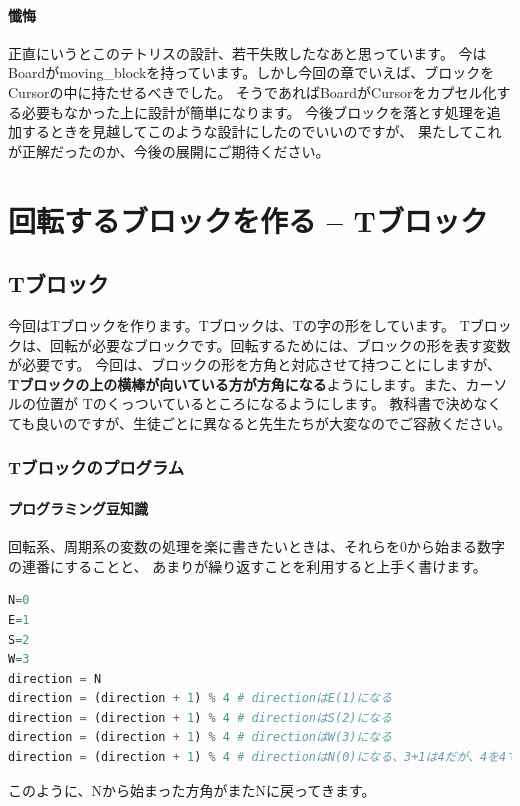 \documentclass[12pt, a4paper, dvipdfmx]{book}
\begin{document}
\subsubsection{懺悔}
正直にいうとこのテトリスの設計、若干失敗したなあと思っています。
今はBoardがmoving\_blockを持っています。しかし今回の章でいえば、ブロックをCursorの中に持たせるべきでした。
そうであればBoardがCursorをカプセル化する必要もなかった上に設計が簡単になります。
今後ブロックを落とす処理を追加するときを見越してこのような設計にしたのでいいのですが、
果たしてこれが正解だったのか、今後の展開にご期待ください。

\chapter{回転するブロックを作る -- Tブロック}
\section{Tブロック}
今回はTブロックを作ります。Tブロックは、Tの字の形をしています。
Tブロックは、回転が必要なブロックです。回転するためには、ブロックの形を表す変数が必要です。
今回は、ブロックの形を方角と対応させて持つことにしますが、
\textbf{Tブロックの上の横棒が向いている方が方角になる}ようにします。また、カーソルの位置が
Tのくっついているところになるようにします。
教科書で決めなくても良いのですが、生徒ごとに異なると先生たちが大変なのでご容赦ください。

\subsection{Tブロックのプログラム}



\newpage
\subsubsection{プログラミング豆知識}
回転系、周期系の変数の処理を楽に書きたいときは、それらを0から始まる数字の連番にすることと、
あまりが繰り返すことを利用すると上手く書けます。
\begin{lstlisting}[caption=方角を扱う,language=Python]
N=0
E=1
S=2
W=3
direction = N
direction = (direction + 1) % 4 # directionはE(1)になる
direction = (direction + 1) % 4 # directionはS(2)になる
direction = (direction + 1) % 4 # directionはW(3)になる
direction = (direction + 1) % 4 # directionはN(0)になる、3+1は4だが、4を4で割った余りは0なため
\end{lstlisting}
このように、Nから始まった方角がまたNに戻ってきます。
\end{document}
